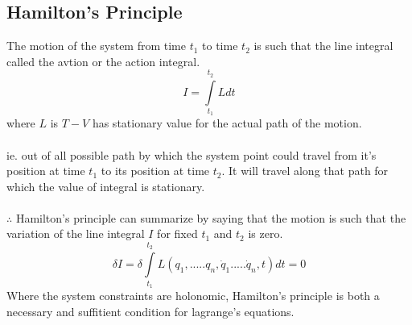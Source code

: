 	\subsection{Hamilton's Principle}
	The motion of the system from time $t_1 $ to time $t_2$ is such that the line integral called the avtion or the action integral.
	\begin{equation}
	I=\int\limits_{t_1}^{t_2}Ldt
	\end{equation}
	where $L$ is $T-V$ has stationary value for the actual path of the motion.\\\\
	ie. out of all possible path by which the system point could travel from it's position at time $t_1$ to its position at time $t_2$. It will travel along that path for which the value of integral is stationary.\\\\
	$\therefore$ Hamilton's principle can summarize by saying that the motion is such that the variation of the line integral $I$ for fixed $t_1$ and $t_2$ is zero.
	\begin{equation}
		\delta I=\delta\int\limits_{t_1}^{t_2}L(q_1,.....q_n,\dot{q}_1.....\dot{q}_n,t)dt=0
	\end{equation}
	Where the system constraints are holonomic, Hamilton's principle is both a necessary and suffitient condition for lagrange's equations.
